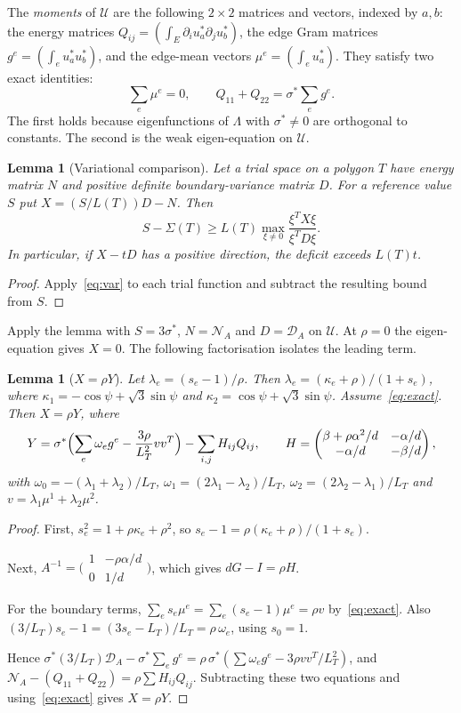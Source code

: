 \documentclass[11pt]{article}
\newtheorem{lemma}[theorem]{Lemma}
\theoremstyle{definition}
\theoremstyle{remark}
\newcommand{\Lam}{\Lambda}
\begin{document}
The \emph{moments} of $\mathcal U$ are the following $2\times2$ matrices and vectors, indexed by $a,b$: the
energy matrices $Q_{ij}=(\int_E\partial_iu^*_a\partial_ju^*_b)$, the edge Gram matrices
$g^e=(\int_eu^*_au^*_b)$, and the edge-mean vectors $\mu^e=(\int_eu^*_a)$. They satisfy two exact identities:
\begin{equation}\label{eq:exact}
\textstyle\sum_e\mu^e=0,\qquad Q_{11}+Q_{22}=\sigma^*\sum_eg^e .
\end{equation}
The first holds because eigenfunctions of $\Lam$ with $\sigma^*\neq0$ are orthogonal to constants. The
second is the weak eigen-equation on $\mathcal U$.

\begin{lemma}[Variational comparison]\label{lem:crit}
Let a trial space on a polygon $T$ have energy matrix $N$ and positive definite boundary-variance
matrix $D$. For a reference value $S$ put $X=(S/L(T))D-N$. Then
\[
S-\Sigma(T)\ge L(T)\max_{\xi\ne0}\frac{\xi^TX\xi}{\xi^TD\xi}.
\]
In particular, if $X-tD$ has a positive direction, the deficit exceeds $L(T)t$.
\end{lemma}
\begin{proof}
Apply~\eqref{eq:var} to each trial function and subtract the resulting bound from $S$.
\end{proof}

Apply the lemma with $S=3\sigma^*$, $N=\mathcal N_A$ and $D=\mathcal D_A$ on $\mathcal U$.
At $\rho=0$ the eigen-equation gives $X=0$. The following factorisation isolates the leading term.
\begin{lemma}[$X=\rho Y$]\label{lem:XrhoY}
Let $\lambda_e=(s_e-1)/\rho$. Then $\lambda_e=(\kappa_e+\rho)/(1+s_e)$, where
$\kappa_1=-\cos\psi+\sqrt3\sin\psi$ and $\kappa_2=\cos\psi+\sqrt3\sin\psi$. Assume~\eqref{eq:exact}. Then
$X=\rho Y$, where
\[Y=\sigma^*\Bigl(\sum_e\omega_eg^e-\frac{3\rho}{L_T^2}vv^T\Bigr)-\sum_{i,j}H_{ij}Q_{ij},\qquad
H=\begin{pmatrix}\beta+\rho\alpha^2/d&-\alpha/d\\-\alpha/d&-\beta/d\end{pmatrix},\]
with $\omega_0=-(\lambda_1+\lambda_2)/L_T$, $\omega_1=(2\lambda_1-\lambda_2)/L_T$,
$\omega_2=(2\lambda_2-\lambda_1)/L_T$ and $v=\lambda_1\mu^1+\lambda_2\mu^2$.
\end{lemma}
\begin{proof}
First, $s_e^2=1+\rho\kappa_e+\rho^2$, so $s_e-1=\rho(\kappa_e+\rho)/(1+s_e)$.

Next, $A^{-1}=\bigl(\begin{smallmatrix}1&-\rho\alpha/d\\0&1/d\end{smallmatrix}\bigr)$, which gives
$dG-I=\rho H$.

For the boundary terms, $\sum_es_e\mu^e=\sum_e(s_e-1)\mu^e=\rho v$ by~\eqref{eq:exact}. Also
$(3/L_T)s_e-1=(3s_e-L_T)/L_T=\rho\,\omega_e$, using $s_0=1$.

Hence $\sigma^*(3/L_T)\mathcal D_A-\sigma^*\sum_eg^e=\rho\,\sigma^*(\sum\omega_eg^e-3\rho vv^T/L_T^2)$, and
$\mathcal N_A-(Q_{11}+Q_{22})=\rho\sum H_{ij}Q_{ij}$. Subtracting these two equations and
using~\eqref{eq:exact} gives $X=\rho Y$.
\end{proof}
\end{document}
